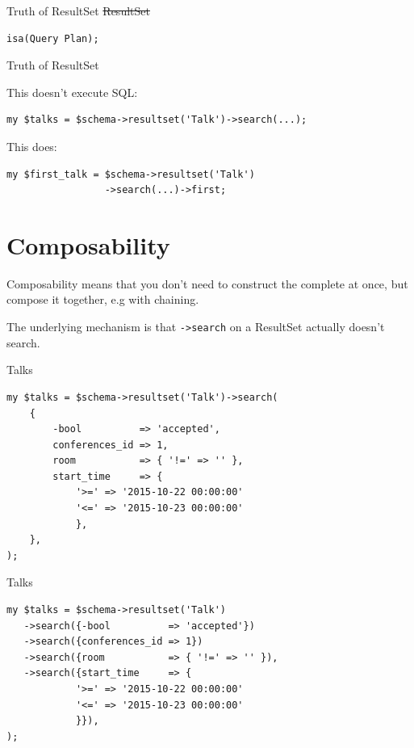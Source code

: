 \begin{frame}[fragile]{Truth of ResultSet}
\sout{ResultSet}

\begin{lstlisting}
isa(Query Plan);
\end{lstlisting}

\end{frame}

\begin{frame}[fragile]{Truth of ResultSet}

This doesn't execute SQL:

\begin{lstlisting}
my $talks = $schema->resultset('Talk')->search(...);
\end{lstlisting}

This does:

\begin{lstlisting}
my $first_talk = $schema->resultset('Talk')
                 ->search(...)->first;
\end{lstlisting}

\end{frame}

\section{Composability}

Composability means that you don't need to construct the
complete at once, but compose it together, e.g with
chaining.

The underlying mechanism is that \verb|->search| on a
ResultSet actually doesn't search.

\begin{frame}[fragile]{Talks}

\begin{lstlisting}
my $talks = $schema->resultset('Talk')->search(
    {
        -bool          => 'accepted',
        conferences_id => 1,
        room           => { '!=' => '' },
        start_time     => {
            '>=' => '2015-10-22 00:00:00'
            '<=' => '2015-10-23 00:00:00'
            },
    },
);
\end{lstlisting}
\end{frame}

\begin{frame}[fragile]{Talks}

\begin{lstlisting}
my $talks = $schema->resultset('Talk')
   ->search({-bool          => 'accepted'})
   ->search({conferences_id => 1})
   ->search({room           => { '!=' => '' }),
   ->search({start_time     => {
            '>=' => '2015-10-22 00:00:00'
            '<=' => '2015-10-23 00:00:00'
            }}),
);
\end{lstlisting}
\end{frame}

